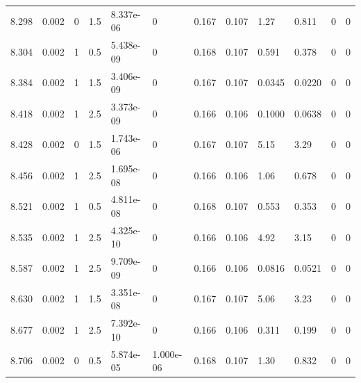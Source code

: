 \documentclass[preview]{standalone}
\begin{document}
{{{{{\begin{tabular}{L{1.2cm}C{1.2cm} C{0.3cm}C{0.5cm} C{1.4cm}C{1.4cm} C{1.4cm}C{1.4cm} C{1.6cm}C{1.6cm} C{1.6cm}C{1.6cm}}
  8.298  &  0.002  & 0     & 1.5 &  8.337e-06  & 0  &  0.167&   0.107& 1.27 & 0.811   &  0 & 0  \\ 
  8.304  &  0.002  & 1     & 0.5 &  5.438e-09  & 0  &  0.168&   0.107& 0.591 & 0.378   &  0 & 0  \\ 
  8.384  &  0.002  & 1     & 1.5 &  3.406e-09  & 0  &  0.167&   0.107& 0.0345 & 0.0220   &  0 & 0  \\ 
  8.418  &  0.002  & 1     & 2.5 &  3.373e-09  & 0  &  0.166&   0.106& 0.1000 & 0.0638   &  0 & 0  \\ 
  8.428  &  0.002  & 0     & 1.5 &  1.743e-06  & 0  &  0.167&   0.107& 5.15 & 3.29   &  0 & 0  \\ 
  8.456  &  0.002  & 1     & 2.5 &  1.695e-08  & 0  &  0.166&   0.106& 1.06 & 0.678   &  0 & 0  \\ 
  8.521  &  0.002  & 1     & 0.5 &  4.811e-08  & 0  &  0.168&   0.107& 0.553 & 0.353   &  0 & 0  \\ 
  8.535  &  0.002  & 1     & 2.5 &  4.325e-10  & 0  &  0.166&   0.106& 4.92 & 3.15   &  0 & 0  \\ 
  8.587  &  0.002  & 1     & 2.5 &  9.709e-09  & 0  &  0.166&   0.106& 0.0816 & 0.0521   &  0 & 0  \\ 
  8.630  &  0.002  & 1     & 1.5 &  3.351e-08  & 0  &  0.167&   0.107& 5.06 & 3.23   &  0 & 0  \\ 
  8.677  &  0.002  & 1     & 2.5 &  7.392e-10  & 0  &  0.166&   0.106& 0.311 & 0.199   &  0 & 0  \\ 
  8.706  &  0.002  & 0     & 0.5 &  5.874e-05  & 1.000e-06  &  0.168&   0.107& 1.30 & 0.832   &  0 & 0  \\ 
\hline 
\end{tabular} 

}}}}}
\end{document}
